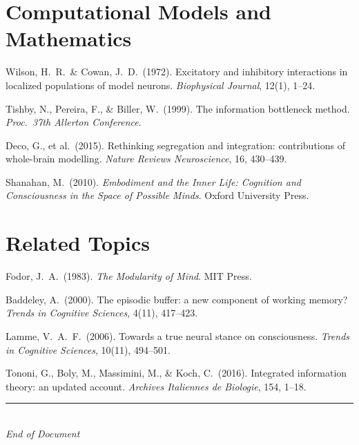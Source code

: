 \documentclass[11pt,a4paper]{report}
\begin{document}
\section*{Computational Models and Mathematics}
\begin{enumerate}[label={[\arabic*]}, leftmargin=2.5em, start=17]
  \item Wilson, H.\ R.\ \& Cowan, J.\ D.\ (1972). Excitatory and inhibitory interactions in localized populations of model neurons. \textit{Biophysical Journal}, 12(1), 1--24.
  \item Tishby, N., Pereira, F., \& Biller, W.\ (1999). The information bottleneck method. \textit{Proc.\ 37th Allerton Conference}.
  \item Deco, G., et al.\ (2015). Rethinking segregation and integration: contributions of whole-brain modelling. \textit{Nature Reviews Neuroscience}, 16, 430--439.
  \item Shanahan, M.\ (2010). \textit{Embodiment and the Inner Life: Cognition and Consciousness in the Space of Possible Minds}. Oxford University Press.
\end{enumerate}

\section*{Related Topics}
\begin{enumerate}[label={[\arabic*]}, leftmargin=2.5em, start=21]
  \item Fodor, J.\ A.\ (1983). \textit{The Modularity of Mind}. MIT Press.
  \item Baddeley, A.\ (2000). The episodic buffer: a new component of working memory? \textit{Trends in Cognitive Sciences}, 4(11), 417--423.
  \item Lamme, V.\ A.\ F.\ (2006). Towards a true neural stance on consciousness. \textit{Trends in Cognitive Sciences}, 10(11), 494--501.
  \item Tononi, G., Boly, M., Massimini, M., \& Koch, C.\ (2016). Integrated information theory: an updated account. \textit{Archives Italiennes de Biologie}, 154, 1--18.
\end{enumerate}

\vfill
\begin{center}
  {\color{gray}\rule{0.4\textwidth}{0.5pt}}\\[8pt]
  {\small\color{gray}\itshape End of Document}
\end{center}
\end{document}
